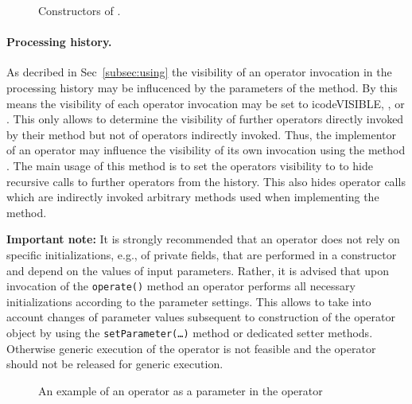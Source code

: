 \begin{figure}

\caption{\label{exa:constructor}Constructors of .}
\end{figure}

\paragraph{Processing history.}
As decribed in Sec~\ref{subsec:using} the visibility of an operator invocation in the
processing history may be
influcenced by the parameters of the   method.
By this means the visibility of each operator invocation may be set to
icode{VISIBLE}, , or .
This only allows to determine the visibility of further operators directly
invoked by their  method but not of operators indirectly invoked.
Thus, the implementor of an operator may influence the visibility
of its own invocation using the method .
The main usage of this method is to set the operators visibility to 
to hide recursive calls to further operators from the history.
This also hides operator calls which are indirectly invoked arbitrary methods used when implementing
the  method.

\textbf{Important note:} It is strongly recommended that an operator
does not rely on specific initializations, e.g., of private fields, that are
performed in a constructor and depend on the values of input parameters. Rather,
it is advised that upon invocation of the \texttt{operate()} method an operator performs all necessary initializations according to the parameter settings.
This allows to take into account changes of parameter values subsequent to
construction of the operator object by using the \texttt{setParameter(\ldots)}
method or dedicated setter methods.
Otherwise generic execution of the operator is not feasible and
the operator should not be released for generic execution.

\begin{figure}[tb]

\caption{\label{exa:operatorAsParameter}An example of an operator as a parameter in the operator }
\end{figure}

